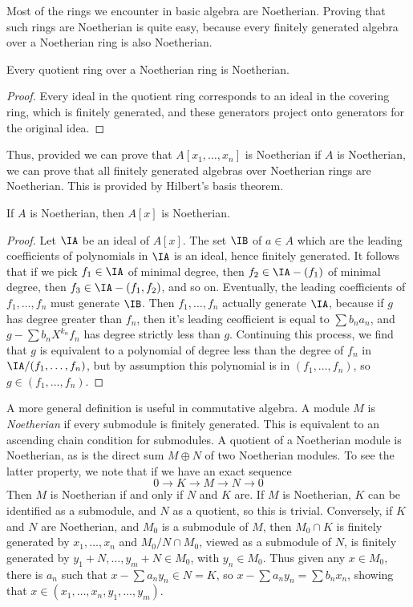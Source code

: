 Most of the rings we encounter in basic algebra are Noetherian. Proving that such rings are Noetherian is quite easy, because every finitely generated algebra over a Noetherian ring is also Noetherian.

\begin{lemma}
    Every quotient ring over a Noetherian ring is Noetherian.
\end{lemma}
\begin{proof}
    Every ideal in the quotient ring corresponds to an ideal in the covering ring, which is finitely generated, and these generators project onto generators for the original idea.
\end{proof}

Thus, provided we can prove that $A[x_1, \dots, x_n]$ is Noetherian if $A$ is Noetherian, we can prove that all finitely generated algebras over Noetherian rings are Noetherian. This is provided by Hilbert's basis theorem.

\begin{theorem}
    If $A$ is Noetherian, then $A[x]$ is Noetherian.
\end{theorem}
\begin{proof}
    Let $\IA$ be an ideal of $A[x]$. The set $\IB$ of $a \in A$ which are the leading coefficients of polynomials in $\IA$ is an ideal, hence finitely generated. It follows that if we pick $f_1 \in \IA$ of minimal degree, then $f_2 \in \IA - (f_1)$ of minimal degree, then $f_3 \in \IA - (f_1, f_2)$, and so on. Eventually, the leading coefficients of $f_1, \dots, f_n$ must generate $\IB$. Then $f_1, \dots, f_n$ actually generate $\IA$, because if $g$ has degree greater than $f_n$, then it's leading ceofficient is equal to $\sum b_n a_n$, and $g - \sum b_n X^{k_n} f_n$ has degree strictly less than $g$. Continuing this process, we find that $g$ is equivalent to a polynomial of degree less than the degree of $f_n$ in $\IA/(f_1, \dots, f_n)$, but by assumption this polynomial is in $(f_1, \dots, f_n)$, so $g \in (f_1, \dots, f_n)$.
\end{proof}

A more general definition is useful in commutative algebra. A module $M$ is \emph{Noetherian} if every submodule is finitely generated. This is equivalent to an ascending chain condition for submodules. A quotient of a Noetherian module is Noetherian, as is the direct sum $M \oplus N$ of two Noetherian modules. To see the latter property, we note that if we have an exact sequence
%
\[ 0 \to K \to M \to N \to 0 \]
%
Then $M$ is Noetherian if and only if $N$ and $K$ are. If $M$ is Noetherian, $K$ can be identified as a submodule, and $N$ as a quotient, so this is trivial. Conversely, if $K$ and $N$ are Noetherian, and $M_0$ is a submodule of $M$, then $M_0 \cap K$ is finitely generated by $x_1, \dots, x_n$ and $M_0/N \cap M_0$, viewed as a submodule of $N$, is finitely generated by $y_1 + N, \dots, y_m + N \in M_0$, with $y_n \in M_0$. Thus given any $x \in M_0$, there is $a_n$ such that $x - \sum a_ny_n \in N = K$, so $x - \sum a_ny_n = \sum b_nx_n$, showing that $x \in (x_1, \dots, x_n, y_1, \dots, y_m)$.

